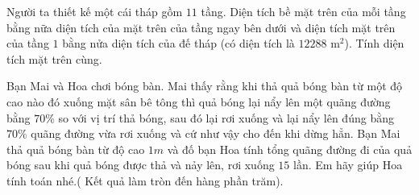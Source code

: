 \begin{bt}%
	Người ta thiết kế một cái tháp gồm $11$ tầng. Diện tích bề mặt trên của mỗi tầng bằng nữa diện tích của mặt trên của tầng ngay bên dưới và diện tích mặt trên của tầng $1$ bằng nửa diện tích của đế tháp (có diện tích là $12288$ m$^2$). Tính diện tích mặt trên cùng.\par
\end{bt}

\begin{bt}%

	Bạn Mai và Hoa chơi bóng bàn. Mai thấy rằng khi thả quả bóng bàn từ một độ cao nào đó xuống mặt sân bê tông thì quả bóng lại nẩy lên một quãng đường bằng $70\%$ so với vị trí thả bóng, sau đó lại rơi xuống và lại nẩy lên đúng bằng $70\%$  quãng đường vừa rơi xuống và cứ như vậy cho đến khi dừng hẳn. Bạn Mai thả quả bóng bàn từ độ cao $1m$  và đố bạn Hoa tính tổng quãng đường đi của quả bóng sau khi quả bóng được thả và nảy lên, rơi xuống $15$ lần. Em hãy giúp Hoa tính toán nhé.( Kết quả làm tròn đến hàng phần trăm).
\end{bt}

